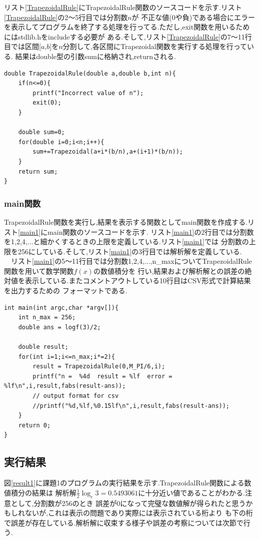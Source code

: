\documentclass[dvipdfmx]{jarticle}
\begin{document}
  リスト\ref{TrapezoidalRule}にTrapezoidalRule関数のソースコードを示す.リスト\ref{TrapezoidalRule}の2～5行目では分割数$n$が
  不正な値(0や負)である場合にエラーを表示してプログラムを終了する処理を行ってる.ただし,exit関数を用いるためにはstdlib.hをincludeする必要が
  ある.そして,リスト\ref{TrapezoidalRule}の7～11行目では区間[$a$,$b$]を$n$分割して,各区間にTrapezoidal関数を実行する処理を行っている.
  結果はdouble型の引数sumに格納され,returnされる.
      \begin{lstlisting}[basicstyle=\ttfamily\footnotesize, frame=single,label=TrapezoidalRule,caption=TrapezoidalRule関数]
double TrapezoidalRule(double a,double b,int n){
    if(n<=0){
        printf("Incorrect value of n");
        exit(0);
    }

    double sum=0;
    for(double i=0;i<n;i++){
        sum+=Trapezoidal(a+i*(b/n),a+(i+1)*(b/n));
    }
    return sum;
}
            \end{lstlisting}

    \subsubsection{main関数}
    TrapezoidalRule関数を実行し,結果を表示する関数としてmain関数を作成する.リスト\ref{main1}にmain関数のソースコードを示す.
    リスト\ref{main1}の2行目では分割数を1,2,4,$\dots$と細かくするときの上限を定義している.リスト\ref{main1}では
    分割数の上限を256にしている.そして,リスト\ref{main1}の3行目では解析解を定義している.\\
    　リスト\ref{main1}の5～11行目では分割数1,2,4,$\dots$,n\_maxについてTrapezoidalRule関数を用いて数学関数$f(x)$の数値積分を
    行い,結果および解析解との誤差の絶対値を表示している.またコメントアウトしている10行目はCSV形式で計算結果を出力するための
    フォーマットである.
      \begin{lstlisting}[basicstyle=\ttfamily\footnotesize, frame=single,label=main1,caption=main1関数]
int main(int argc,char *argv[]){
    int n_max = 256;
    double ans = logf(3)/2;

    double result;
    for(int i=1;i<=n_max;i*=2){
        result = TrapezoidalRule(0,M_PI/6,i);
        printf("n =  %4d  result = %lf  error = %lf\n",i,result,fabs(result-ans));
        // output format for csv
        //printf("%d,%lf,%0.15lf\n",i,result,fabs(result-ans));
    }
    return 0;
}
            \end{lstlisting}

    \subsection{実行結果}
    図\ref{result1}に課題1のプログラムの実行結果を示す.TrapezoidalRule関数による数値積分の結果は
    解析解$\frac{1}{2} \log_{e} 3 = 0.5493061$に十分近い値であることがわかる.注意として,分割数が256のとき
    誤差が0になって完璧な数値解が得られたと思うかもしれないが,これは表示の問題であり実際には表示されている桁より
    も下の桁で誤差が存在している.解析解に収束する様子や誤差の考察については次節で行う.
    
\end{document}

